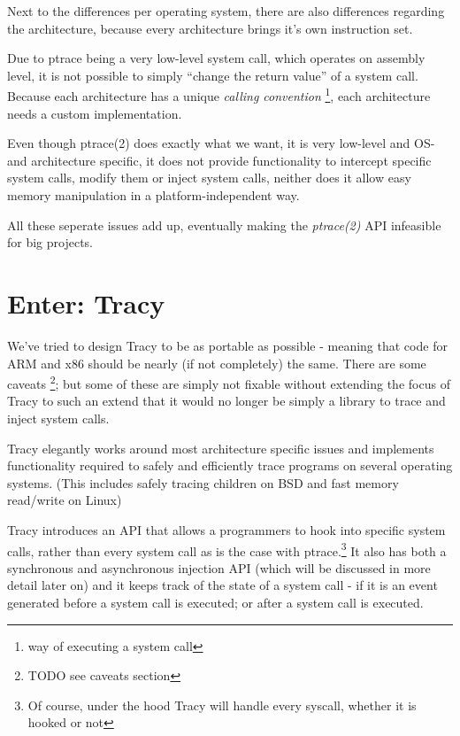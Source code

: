 \documentclass[a4paper, twoside, 10pt, twocolumn]{report}
\begin{document}
Next to the differences per operating system, there are also differences
regarding the architecture, because every architecture brings it's own
instruction set.

Due to ptrace being a very low-level system call, which operates on assembly
level, it is not possible to simply ``change the return value'' of a system
call. Because each architecture has a unique \textit{calling convention}
\footnote{way of executing a system call}, each architecture needs a custom
implementation.



Even though ptrace(2) does exactly what we want, it is very low-level and OS-
and architecture specific, it does not provide functionality to intercept
specific system calls, modify them or inject system calls, neither does it
allow easy memory manipulation in a platform-independent way.

All these seperate issues add up, eventually making the \textit{ptrace(2)} API
infeasible for big projects.

\section{Enter: Tracy}

We've tried to design Tracy to be as portable as possible - meaning that code
for ARM and x86 should be nearly (if not completely) the same. There are some
caveats \footnote{TODO see caveats section}; but some of these are simply not
fixable without extending the focus of Tracy to such an extend that it would no
longer be simply a library to trace and inject system calls.

Tracy elegantly works around most architecture specific issues and implements
functionality required to safely and efficiently trace programs on several
operating systems. (This includes safely tracing children on BSD and fast memory
read/write on Linux)

Tracy introduces an API that allows a programmers to hook into specific system
calls, rather than every system call as is the case with ptrace.\footnote{Of
course, under the hood Tracy will handle every syscall, whether it is hooked
or not}
It also has both a synchronous and asynchronous injection API (which
will be discussed in more detail later on) and it keeps track of the state of a
system call - if it is an event generated before a system call is executed; or
after a system call is executed.
\end{document}
